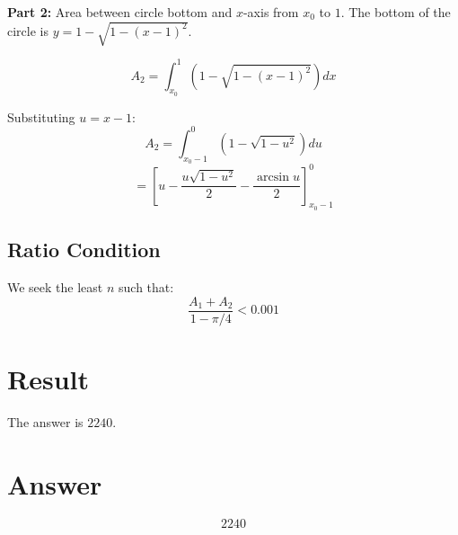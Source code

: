 \documentclass[12pt]{article}
\begin{document}
\textbf{Part 2:} Area between circle bottom and $x$-axis from $x_0$ to $1$. The bottom of the circle is $y = 1 - \sqrt{1 - (x-1)^2}$.

\[
A_2 = \int_{x_0}^{1} \left(1 - \sqrt{1 - (x-1)^2}\right) dx
\]

Substituting $u = x - 1$:
\[
A_2 = \int_{x_0 - 1}^{0} \left(1 - \sqrt{1 - u^2}\right) du
\]
\[
= \left[u - \frac{u\sqrt{1 - u^2}}{2} - \frac{\arcsin u}{2}\right]_{x_0 - 1}^{0}
\]

\subsection{Ratio Condition}
We seek the least $n$ such that:
\[
\frac{A_1 + A_2}{1 - \pi/4} < 0.001
\]

\section{Result}
The answer is $\boxed{2240}$.

\section{Answer}

\[
\boxed{2240}
\]
\end{document}
